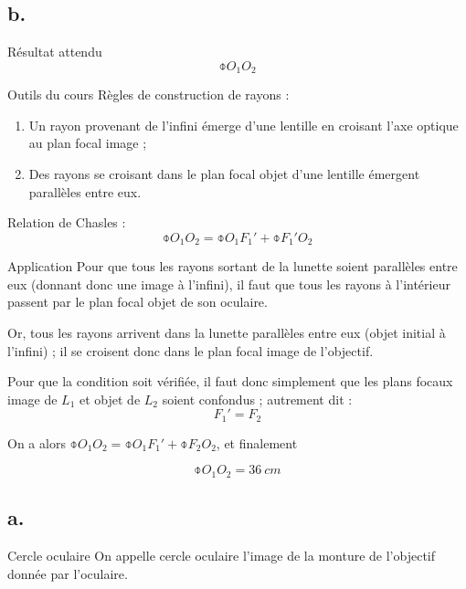 \documentclass[10pt,a5paper,notitlepage]{book}
\begin{document}
\setcounter{subsection}{1}
\subsection{b.}
\begin{NCprop}{Résultat attendu}
    $$\obar{O_1O_2}$$
\end{NCprop}

\begin{NCdemo}{Outils du cours}
    Règles de construction de rayons :
    \begin{enumerate}

        \item Un rayon provenant de l'infini émerge d'une lentille en croisant
            l'axe optique au plan focal image ;

        \item Des rayons se croisant dans le plan focal objet d'une lentille
            émergent parallèles entre eux.
    \end{enumerate}
    Relation de Chasles :
    \[ \obar{O_1O_2} = \obar{O_1F_1'} + \obar{F_1'O_2} \]
\end{NCdemo}

\begin{NCexem}{Application}
    Pour que tous les rayons sortant de la lunette soient parallèles entre eux
    (donnant donc une image à l'infini), il faut que tous les rayons à
    l'intérieur passent par le plan focal objet de son oculaire.\bigbreak

    Or, tous les rayons arrivent dans la lunette parallèles entre eux (objet
    initial à l'infini) ; il se croisent donc dans le plan focal image de
    l'objectif. \bigbreak

    Pour que la condition soit vérifiée, il faut donc simplement que les plans
    focaux image de $L_1$ et objet de $L_2$ soient confondus ; autrement dit :
    \[ \boxed{F_1' = F_2} \]
    
    On a alors $\obar{O_1O_2} = \obar{O_1F_1'} + \obar{F_2O_2}$, et finalement

    \[ \boxed{\obar{O_1O_2} = \SI{+36}{cm}} \]
\end{NCexem}

\subsection{a.}
\begin{defi}{Cercle oculaire}
    On appelle cercle oculaire l'image de la monture de l'objectif donnée par
    l'oculaire.
\end{defi}
\end{document}
